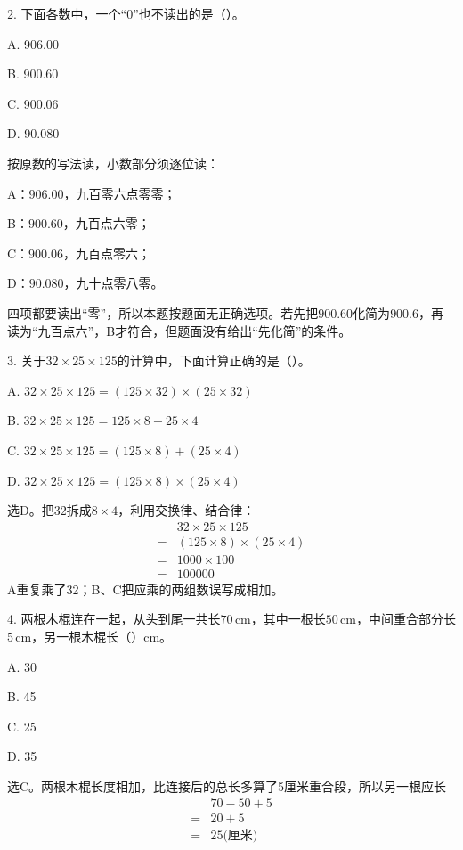 2. 下面各数中，一个“0”也不读出的是（\hspace{1.8em}）。\par
\noindent A. 906.00\par
\noindent B. 900.60\par
\noindent C. 900.06\par
\noindent D. 90.080\par
\begin{BookAnswer}
按原数的写法读，小数部分须逐位读：\par A：\(906.00\)，九百零六点零零；\par B：\(900.60\)，九百点六零；\par C：\(900.06\)，九百点零六；\par D：\(90.080\)，九十点零八零。\par 四项都要读出“零”，所以本题按题面无正确选项。若先把\(900.60\)化简为\(900.6\)，再读为“九百点六”，B才符合，但题面没有给出“先化简”的条件。
\end{BookAnswer}

3. 关于\(32\times25\times125\)的计算中，下面计算正确的是（\hspace{1.8em}）。\par
\noindent A. \(32\times25\times125=(125\times32)\times(25\times32)\)\par
\noindent B. \(32\times25\times125=125\times8+25\times4\)\par
\noindent C. \(32\times25\times125=(125\times8)+(25\times4)\)\par
\noindent D. \(32\times25\times125=(125\times8)\times(25\times4)\)\par
\begin{BookAnswer}
选D。把\(32\)拆成\(8\times4\)，利用交换律、结合律：\[\begin{aligned} &32\times25\times125\\ ={}&(125\times8)\times(25\times4)\\ ={}&1000\times100\\ ={}&100000\end{aligned}\]A重复乘了32；B、C把应乘的两组数误写成相加。
\end{BookAnswer}

4. 两根木棍连在一起，从头到尾一共长\(70\,\mathrm{cm}\)，其中一根长\(50\,\mathrm{cm}\)，中间重合部分长\(5\,\mathrm{cm}\)，另一根木棍长（\hspace{1.8em}）\(\mathrm{cm}\)。\par
\noindent A. 30\par
\noindent B. 45\par
\noindent C. 25\par
\noindent D. 35\par
\begin{BookAnswer}
选C。两根木棍长度相加，比连接后的总长多算了5厘米重合段，所以另一根应长\[\begin{aligned} &70-50+5\\ ={}&20+5\\ ={}&25\text{(厘米)}\end{aligned}\]
\end{BookAnswer}

